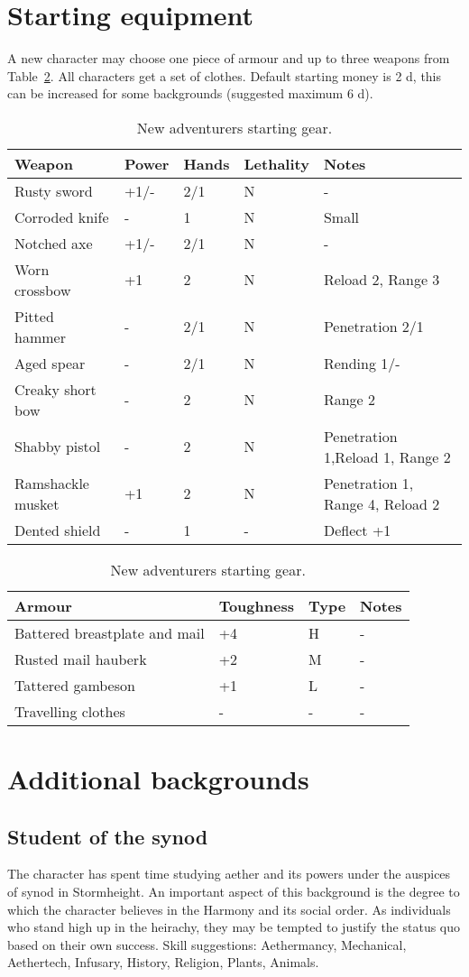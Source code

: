 \documentclass[a4paper,11pt,oneside]{book}
\begin{document}
\section{Starting equipment}
A new character may choose one piece of armour and up to three weapons from Table~\ref{tab:start-gear}. All characters get a set of clothes. Default starting money is 2 d, this can be increased for some backgrounds (suggested maximum 6 d).
\begin{table}[ht!]
	\centering
	\caption{New adventurers starting gear.}
	\label{tab:start-gear}
	\begin{tabular}{|l|l|l|l|l|}
		\hline
		Weapon & Power & Hands &  Lethality & Notes\\
		\hline
		Rusty sword & +1/- & 2/1 & N & -\\
		Corroded knife & - & 1 & N & Small\\
		Notched axe & +1/- & 2/1 & N & -\\
		Worn crossbow & +1 & 2 & N & Reload 2, Range 3\\
		Pitted hammer & - & 2/1 & N & Penetration 2/1 \\
		Aged spear & - & 2/1 & N & Rending 1/-\\
		Creaky short bow & - & 2 & N & Range 2\\
		Shabby pistol & - & 2 & N & Penetration 1,Reload 1, Range 2 \\
		Ramshackle musket & +1 & 2 & N & Penetration 1, Range 4, Reload 2 \\
		Dented shield & - & 1 & - & Deflect +1 \\
		\hline
	\end{tabular}
	\begin{tabular}{|l|l|l|l|}	
		\hline
		Armour & Toughness & Type & Notes\\
		\hline
		Battered breastplate and mail & +4 & H & - \\
		Rusted mail hauberk & +2 & M & - \\
		Tattered gambeson & +1 & L & - \\
		Travelling clothes & - & - & - \\
		\hline
	\end{tabular}
\end{table}


\section{Additional backgrounds}

\subsection{Student of the synod}
The character has spent time studying aether and its powers under the auspices of synod in Stormheight. An important aspect of this background is the degree to which the character believes in the Harmony and its social order. As individuals who stand high up in the heirachy, they may be tempted to justify the status quo based on their own success. Skill suggestions: Aethermancy, Mechanical, Aethertech, Infusary, History, Religion, Plants, Animals.
\end{document}
